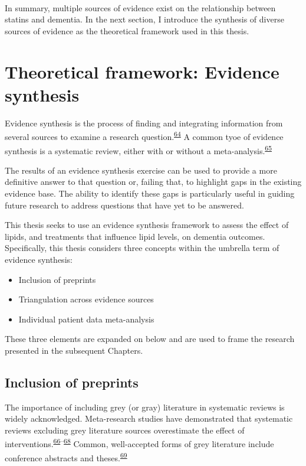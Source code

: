 \documentclass[a4paper, twoside]{templates/ociamthesis}
\providecommand{\tightlist}{%
  \setlength{\itemsep}{0pt}\setlength{\parskip}{0pt}}
\begin{document}
~

In summary, multiple sources of evidence exist on the relationship between statins and dementia. In the next section, I introduce the synthesis of diverse sources of evidence as the theoretical framework used in this thesis.

\hypertarget{theoretical-framework-evidence-synthesis}{%
\section{Theoretical framework: Evidence synthesis}\label{theoretical-framework-evidence-synthesis}}

Evidence synthesis is the process of finding and integrating information from several sources to examine a research question.\textsuperscript{\protect\hyperlink{ref-donnelly2018a}{64}} A common tyoe of evidence synthesis is a systematic review, either with or without a meta-analysis.\textsuperscript{\protect\hyperlink{ref-chandler2019chapter}{65}}

The results of an evidence synthesis exercise can be used to provide a more definitive answer to that question or, failing that, to highlight gaps in the existing evidence base. The ability to identify these gaps is particularly useful in guiding future research to address questions that have yet to be answered.

This thesis seeks to use an evidence synthesis framework to assess the effect of lipids, and treatments that influence lipid levels, on dementia outcomes.
Specifically, this thesis considers three concepts within the umbrella term of evidence synthesis:

\begin{itemize}
\tightlist
\item
  Inclusion of preprints
\item
  Triangulation across evidence sources
\item
  Individual patient data meta-analysis
\end{itemize}

These three elements are expanded on below and are used to frame the research presented in the subsequent Chapters.

\hypertarget{diverse-sources-preprints}{%
\subsection{Inclusion of preprints}\label{diverse-sources-preprints}}

The importance of including grey (or gray) literature in systematic reviews is widely acknowledged. Meta-research studies have demonstrated that systematic reviews excluding grey literature sources overestimate the effect of interventions.\textsuperscript{\protect\hyperlink{ref-conn2003}{66}--\protect\hyperlink{ref-hopewell2007}{68}} Common, well-accepted forms of grey literature include conference abstracts and theses.\textsuperscript{\protect\hyperlink{ref-lefebvre2019searching}{69}}
\end{document}
